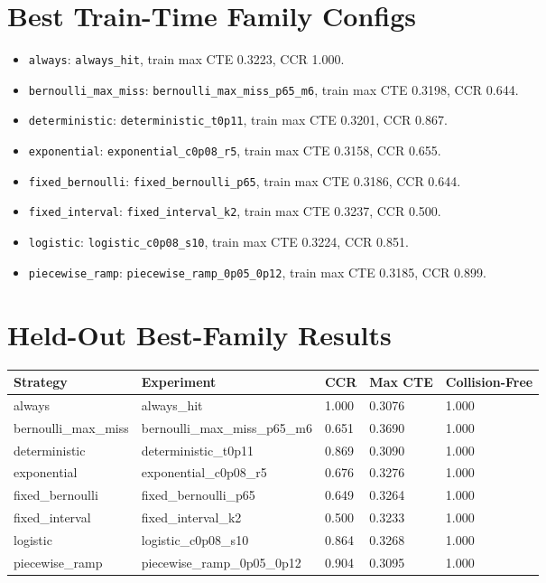 \documentclass[conference]{IEEEtran}
\begin{document}
\section{Best Train-Time Family Configs}
\begin{itemize}[leftmargin=*]
\item \texttt{always}: \texttt{always\_hit}, train max CTE 0.3223, CCR 1.000. \item \texttt{bernoulli\_max\_miss}: \texttt{bernoulli\_max\_miss\_p65\_m6}, train max CTE 0.3198, CCR 0.644. \item \texttt{deterministic}: \texttt{deterministic\_t0p11}, train max CTE 0.3201, CCR 0.867. \item \texttt{exponential}: \texttt{exponential\_c0p08\_r5}, train max CTE 0.3158, CCR 0.655. \item \texttt{fixed\_bernoulli}: \texttt{fixed\_bernoulli\_p65}, train max CTE 0.3186, CCR 0.644. \item \texttt{fixed\_interval}: \texttt{fixed\_interval\_k2}, train max CTE 0.3237, CCR 0.500. \item \texttt{logistic}: \texttt{logistic\_c0p08\_s10}, train max CTE 0.3224, CCR 0.851. \item \texttt{piecewise\_ramp}: \texttt{piecewise\_ramp\_0p05\_0p12}, train max CTE 0.3185, CCR 0.899. 
\end{itemize}

\section{Held-Out Best-Family Results}
\begin{tabular}{lllll}
\toprule
Strategy & Experiment & CCR & Max CTE & Collision-Free \\
\midrule
always & always\_hit & 1.000 & 0.3076 & 1.000 \\
bernoulli\_max\_miss & bernoulli\_max\_miss\_p65\_m6 & 0.651 & 0.3690 & 1.000 \\
deterministic & deterministic\_t0p11 & 0.869 & 0.3090 & 1.000 \\
exponential & exponential\_c0p08\_r5 & 0.676 & 0.3276 & 1.000 \\
fixed\_bernoulli & fixed\_bernoulli\_p65 & 0.649 & 0.3264 & 1.000 \\
fixed\_interval & fixed\_interval\_k2 & 0.500 & 0.3233 & 1.000 \\
logistic & logistic\_c0p08\_s10 & 0.864 & 0.3268 & 1.000 \\
piecewise\_ramp & piecewise\_ramp\_0p05\_0p12 & 0.904 & 0.3095 & 1.000 \\
\bottomrule
\end{tabular}
\end{document}

